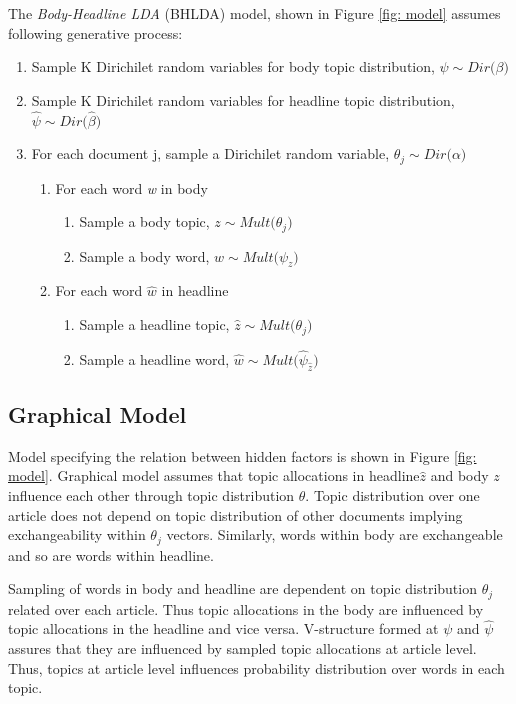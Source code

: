 \documentclass[a4paper]{article}
\begin{document}
The \textit{Body-Headline LDA} (BHLDA) model, shown in Figure \ref{fig: model} assumes following generative process:
\begin{enumerate}
\item Sample K Dirichilet random variables for body topic distribution, $\psi \sim \textit{Dir($\beta$)}$
\item Sample K Dirichilet random variables for headline topic distribution, $\hat{\psi} \sim \textit{Dir($\hat{\beta}$)}$ 
\item For each document j, sample a Dirichilet random variable, $\theta_{j} \sim \textit{Dir($\alpha$)}$
\begin{enumerate}[label =(\alph*)]
\item For each word \textit{w} in body
\begin{enumerate}
\item Sample a body topic, $z \sim \textit{Mult($\theta_{j}$)}$
\item Sample a body word, $w \sim \textit{Mult($\psi_{z}$)}$
\end{enumerate}
\item For each word \textit{$\hat{w}$} in headline
\begin{enumerate}
\item Sample a headline topic, $\hat{z} \sim \textit{Mult($\theta_{j}$)}$
\item Sample a headline word, $\hat{w} \sim \textit{Mult($\hat{\psi}_{\hat{z}}$)}$
\end{enumerate} 
\end{enumerate}
\end{enumerate}

\subsection{Graphical Model}
Model specifying the relation between hidden factors is shown in Figure \ref{fig: model}. Graphical model assumes that topic allocations in headline$\hat{z}$ and body $z$ influence each other through topic distribution $\theta$. Topic distribution over one article does not depend on topic distribution of other documents implying exchangeability within $\theta_{j}$ vectors. Similarly, words within body are exchangeable and so are words within headline.

Sampling of words in body and headline are dependent on topic distribution $\theta_{j}$ related over each article. Thus topic allocations in the body are influenced by topic allocations in the headline and vice versa. V-structure formed at $\psi$ and $\hat{\psi}$ assures that they are influenced by sampled topic allocations at article level. Thus, topics at article level influences probability distribution over words in each topic.
\end{document}
